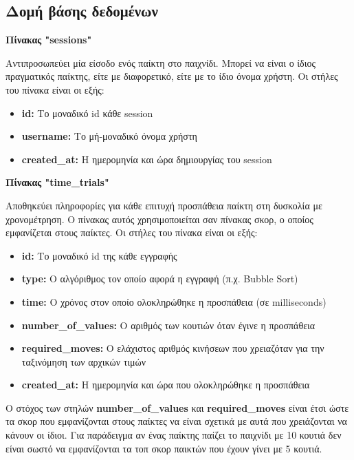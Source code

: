 {}
\subsection*{Δομή βάσης δεδομένων}


\textbf{Πίνακας "sessions"}

Αντιπροσωπεύει μία είσοδο ενός παίκτη στο παιχνίδι. Μπορεί να είναι ο ίδιος πραγματικός παίκτης, είτε με διαφορετικό, είτε με το ίδιο όνομα χρήστη. Οι στήλες του πίνακα είναι οι εξής:

\begin{itemize}
    \item \textbf{id:} Το μοναδικό id κάθε session
    \item \textbf{username:} Το μή-μοναδικό όνομα χρήστη
    \item \textbf{created\_at:} Η ημερομηνία και ώρα δημιουργίας του session
\end{itemize}


\vspace{5mm}
\textbf{Πίνακας "time\_trials"}

Αποθηκεύει πληροφορίες για κάθε επιτυχή προσπάθεια παίκτη στη δυσκολία με χρονομέτρηση. Ο πίνακας αυτός χρησιμοποιείται σαν πίνακας σκορ, ο οποίος εμφανίζεται στους παίκτες. Οι στήλες του πίνακα είναι οι εξής:

\begin{itemize}
    \item \textbf{id:} Το μοναδικό id της κάθε εγγραφής
    \item \textbf{type:} Ο αλγόριθμος τον οποίο αφορά η εγγραφή (π.χ. Bubble Sort)
    \item \textbf{time:} Ο χρόνος στον οποίο ολοκληρώθηκε η προσπάθεια (σε milliseconds)
    \item \textbf{number\_of\_values:} Ο αριθμός των κουτιών όταν έγινε η προσπάθεια
    \item \textbf{required\_moves:} Ο ελάχιστος αριθμός κινήσεων που χρειαζόταν για την ταξινόμηση των αρχικών τιμών
    \item \textbf{created\_at:} Η ημερομηνία και ώρα που ολοκληρώθηκε η προσπάθεια
\end{itemize}

Ο στόχος των στηλών \textbf{number\_of\_values} και \textbf{required\_moves} είναι έτσι ώστε τα σκορ που εμφανίζονται στους παίκτες να είναι σχετικά με αυτά που χρειάζονται να κάνουν οι ίδιοι. Για παράδειγμα αν ένας παίκτης παίζει το παιχνίδι με 10 κουτιά δεν είναι σωστό να εμφανίζονται τα τοπ σκορ παικτών που έχουν γίνει με 5 κουτιά.

